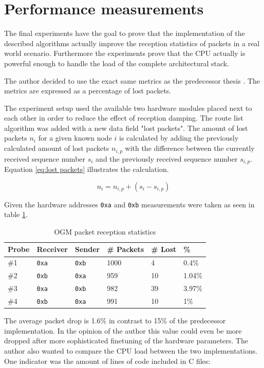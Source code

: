 \section{Performance measurements}%
The final experiments have the goal to prove that the implementation of the described algorithms actually improve the reception statistics of packets in a real world scenario. Furthermore the experiments prove that the CPU actually is powerful enough to handle the load of the complete architectural stack.

The author decided to use the exact same metrics as the predecessor thesis \cite{korniowski}. The metrics are expressed as a percentage of lost packets.

The experiment setup used the available two hardware modules placed next to each other in order to reduce the effect of reception damping. The route list algorithm was added with a new data field "lost packets". The amount of lost packets $n_i$ for a given known node $i$ is calculated by adding the previously calculated amount of lost packets $n_{i,p}$ with the difference between the currently received sequence number $s_i$ and the previously received sequence number $s_{i,p}$. Equation \ref{eq:lost packets} illustrates the calculation.

\begin{equation}
\label{eq:lost packets}
n_i = n_{i,p} + (s_i - s_{i,p})
\end{equation}

Given the hardware addresses \texttt{0xa} and \texttt{0xb} measurements were taken as seen in table \ref{tab:probes}.

\begin{table}[H]
\centering
\begin{tabular}{l | l | l | l | l | l}
Probe & Receiver & Sender & \# Packets & \# Lost & \% \\
\hline
\#1 & \texttt{0xa} & \texttt{0xb} & 1000 & 4 & 0.4\% \\
\#2 & \texttt{0xb} & \texttt{0xa} & 959 & 10 & 1.04\% \\
\#3 & \texttt{0xa} & \texttt{0xb} & 982 & 39 & 3.97\% \\
\#4 & \texttt{0xb} & \texttt{0xa} & 991 & 10 & 1\% \\
\end{tabular}
\caption{OGM packet reception statistics}
\label{tab:probes}
\end{table}

The average packet drop is 1.6\% in contrast to 15\% of the predecessor implementation. In the opinion of the author this value could even be more dropped after more sophisticated finetuning of the hardware parameters. The author also wanted to compare the CPU load between the two implementations. One indicator was the amount of lines of code included in C files:

